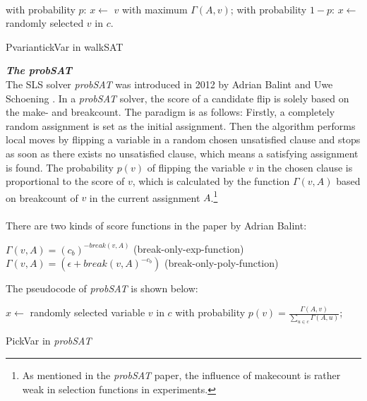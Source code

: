 \documentclass[12pt,a4paper,twoside]{scrartcl}
\numberwithin{equation}{section}
\begin{document}
\\
\begin{algorithm}[H]
  with probability $p$: $x \leftarrow$   $v$ with maximum $\Gamma(A,v)$; \;
  with probability $1-p$:  $x \leftarrow$  randomly selected $v$ in $c$. 
 \caption{PvariantickVar in walkSAT}
\end{algorithm}  

\emph{\textbf{The probSAT}}\\
The SLS solver \emph{probSAT} was introduced in 2012 by Adrian Balint and Uwe Schoening \cite{balint2016engineering}. In a \emph{probSAT} solver, the score of a candidate flip is solely based on the make- and breakcount. The paradigm is as follows: Firstly, a completely random assignment is set as the initial assignment. Then the algorithm performs local moves by flipping a variable in a random chosen unsatisfied clause and stops as soon as there exists no unsatisfied clause, which means a satisfying assignment is found. The probability $p(v)$ of flipping the variable $v$ in the chosen clause is proportional to the score of $v$, which is calculated by the function $\Gamma(v,A)$ based on breakcount of $v$ in the current assignment $A$.\footnote{As mentioned in the \emph{probSAT} paper, the influence of makecount is rather weak in selection functions in experiments.} 
\\
 \\ There are two kinds of score functions in the paper by Adrian Balint: \\
\begin{center}
$\Gamma(v,A) = (c_b)^{-break(v,A)}$ (break-only-exp-function) \\
$\Gamma(v,A)=(\epsilon +break(v,A)^{-c_b})$  (break-only-poly-function)\\
\end{center} 
\clearpage
The pseudocode of \emph{probSAT} is shown below:\\
\begin{algorithm}[H]
  $x \leftarrow$ randomly selected  variable $v$ in $c$ with probability $p(v) =\frac{\Gamma(A,v)}{\sum_{u \in c}\Gamma(A,u)}$; 
 \caption{PickVar in \emph{probSAT}}
\end{algorithm} 
\end{document}
